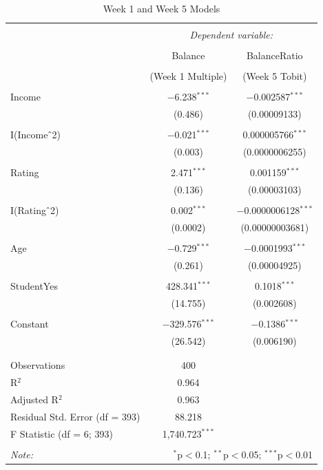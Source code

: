 \documentclass[12pt]{article}
\begin{document}
{\begin{table}[H] \centering 
  \caption{Week 1 and Week 5 Models} 
  \label{} 
\begin{tabular}{@{\extracolsep{5pt}}lcc} 
\\[-1.8ex]\hline 
\hline \\[-1.8ex] 
 & \multicolumn{2}{c}{\textit{Dependent variable:}} \\ 
\cline{2-3} 
\\[-1.8ex] & Balance & BalanceRatio \\ 
\\[-1.8ex] & (Week 1 Multiple) & (Week 5 Tobit)\\ 
\hline \\[-1.8ex] 
 Income & $-$6.238$^{***}$ & $-$0.002587$^{***}$ \\ 
  & (0.486) & (0.00009133) \\ 
  & & \\ 
 I(Income$\hat{\mkern6mu}$2) & $-$0.021$^{***}$ & 0.000005766$^{***}$ \\ 
  & (0.003) & (0.0000006255) \\ 
  & & \\ 
 Rating & 2.471$^{***}$ & 0.001159$^{***}$ \\ 
  & (0.136) & (0.00003103) \\ 
  & & \\ 
 I(Rating$\hat{\mkern6mu}$2) & 0.002$^{***}$ & $-$0.0000006128$^{***}$ \\ 
  & (0.0002) & (0.00000003681) \\ 
  & & \\ 
 Age & $-$0.729$^{***}$ & $-$0.0001993$^{***}$ \\ 
  & (0.261) & (0.00004925) \\ 
  & & \\ 
 StudentYes & 428.341$^{***}$ & 0.1018$^{***}$ \\ 
  & (14.755) & (0.002608) \\ 
  & & \\ 
 Constant & $-$329.576$^{***}$ & $-$0.1386$^{***}$ \\ 
  & (26.542) & (0.006190) \\ 
  & & \\ 
\hline \\[-1.8ex] 
Observations & 400 &  \\ 
R$^{2}$ & 0.964 &  \\ 
Adjusted R$^{2}$ & 0.963 &  \\ 
Residual Std. Error (df = 393) & 88.218 &  \\ 
F Statistic (df = 6; 393) & 1,740.723$^{***}$ & \\ 
\hline 
\hline \\[-1.8ex] 
\textit{Note:}  & \multicolumn{2}{r}{$^{*}$p$<$0.1; $^{**}$p$<$0.05; $^{***}$p$<$0.01} \\ 
\end{tabular} 
\end{table}


}
\end{document}
